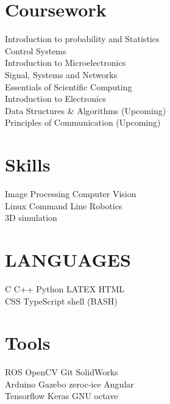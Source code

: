 \documentclass[]{deedy-resume-openfont}
\begin{document}
\begin{minipage}[t]{0.33\textwidth}

\section{Coursework}
Introduction to probability and Statistics \\
Control Systems \\
Introduction to Microelectronics \\
Signal, Systems and Networks \\
Essentials of Scientific Computing \\
Introduction to Electronics \\
Data Structures \& Algorithms (Upcoming) \\
Principles of Communication (Upcoming)
\sectionsep


\section{Skills}
Image Processing \textbullet{} Computer Vision \\
Linux Command Line \textbullet{} Robotics  \\ 
3D simulation
\sectionsep

\section{LANGUAGES}
C \textbullet{}   C++ \textbullet{} Python \textbullet{} LATEX \textbullet{} HTML \\ 
CSS \textbullet{} TypeScript \textbullet{} shell (BASH)
\sectionsep

\section{Tools}
ROS \textbullet{} OpenCV \textbullet{} Git \textbullet{} SolidWorks \\ 
Arduino \textbullet{} Gazebo \textbullet{} zeroc-ice \textbullet{} Angular \\
Tensorflow \textbullet{} Keras \textbullet{} GNU octave
\sectionsep
%
%

\end{minipage} 
\hfill
\end{document}
